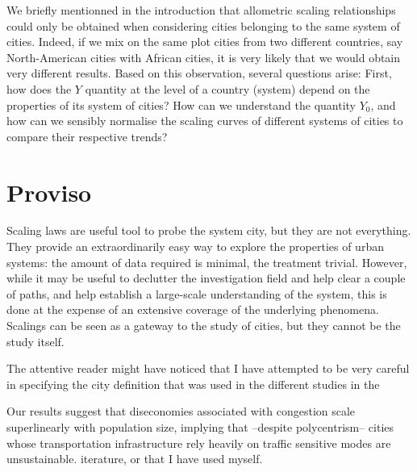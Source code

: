 We briefly mentionned in the introduction that allometric scaling relationships
could only be obtained when considering cities belonging to the same system of
cities. Indeed, if we mix on the same plot cities from two different countries,
say North-American cities with African cities, it is very likely that we would
obtain very different results. Based on this observation, several questions
arise: First, how does the $Y$ quantity at the level of a country (system)
depend on the properties of its system of cities? How can we understand the
quantity $Y_0$, and how can we sensibly normalise the scaling curves of
different systems of cities to compare their respective trends?

\section{Proviso}
\label{sec:poviso}

Scaling laws are useful tool to probe the system city, but they are not
everything. They provide an extraordinarily easy way to explore the properties
of urban systems: the amount of data required is minimal, the treatment
trivial. However, while it may be useful to declutter the investigation field
and help clear a couple of paths, and help establish a large-scale understanding
of the system, this is done at the expense of an extensive coverage of the
underlying phenomena. Scalings can be seen as a gateway to the study of cities,
but they cannot be the study itself.

The attentive reader might have noticed that I have attempted to be very careful
in specifying the city definition that was used in the different studies in the

Our results
suggest that diseconomies associated with congestion scale superlinearly with
population size, implying that --despite polycentrism-- cities whose
transportation infrastructure rely heavily on traffic sensitive modes are
unsustainable.
iterature, or that I have used myself.
